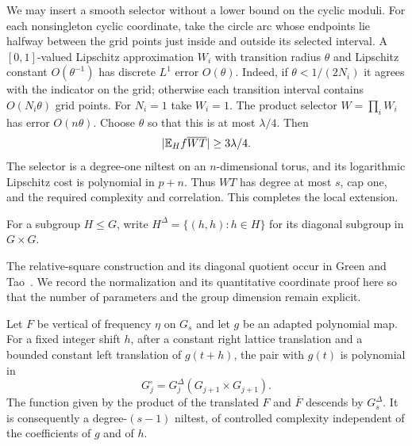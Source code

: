 We may insert a smooth selector without a lower bound on the
cyclic moduli. For each nonsingleton cyclic coordinate, take the
circle arc whose endpoints lie halfway between the grid points
just inside and outside its selected interval. A $[0,1]$-valued
Lipschitz approximation $W_i$ with transition radius $\theta$
and Lipschitz constant $O(\theta^{-1})$ has discrete $L^1$ error
$O(\theta)$. Indeed, if $\theta<1/(2N_i)$ it agrees with the
indicator on the grid; otherwise each transition interval
contains $O(N_i\theta)$ grid points. For $N_i=1$ take $W_i=1$.
The product selector $W=\prod_iW_i$ has error $O(n\theta)$.
Choose $\theta$ so that this is at most $\lambda/4$.
Then
\[
 |\mathbb E_H f\overline{WT}|\ge3\lambda/4.
\]
The selector is a degree-one niltest on an $n$-dimensional torus,
and its logarithmic Lipschitz cost is polynomial in $p+n$.
Thus $WT$ has degree at most $s$, cap one, and the required
complexity and correlation. This completes the local extension.

For a subgroup $H\le G$, write
$H^\Delta=\{(h,h):h\in H\}$ for its diagonal subgroup in $G\times G$.

The relative-square construction and its diagonal quotient occur in
Green and Tao~\cite[Proposition~7.2 and Lemma~7.4]{GreenTaoOrbits2012}.
We record the normalization and its quantitative coordinate proof here
so that the number of parameters and the group dimension remain explicit.

\begin{lemma}\label{prelim:square}
Let $F$ be vertical of frequency $\eta$ on $G_s$ and let $g$ be an
adapted polynomial map.  For a fixed integer shift $h$, after a
constant right lattice translation and a bounded constant left
translation of $g(t+h)$, the pair with $g(t)$ is polynomial in
\[
 G^\square_j=G_j^\Delta(G_{j+1}\times G_{j+1}).
\]
The function given by the product of the translated $F$ and
$\overline F$ descends by $G_s^\Delta$.  It is consequently a
degree-$(s-1)$ niltest, of controlled complexity independent of the
coefficients of $g$ and of $h$.
\end{lemma}

